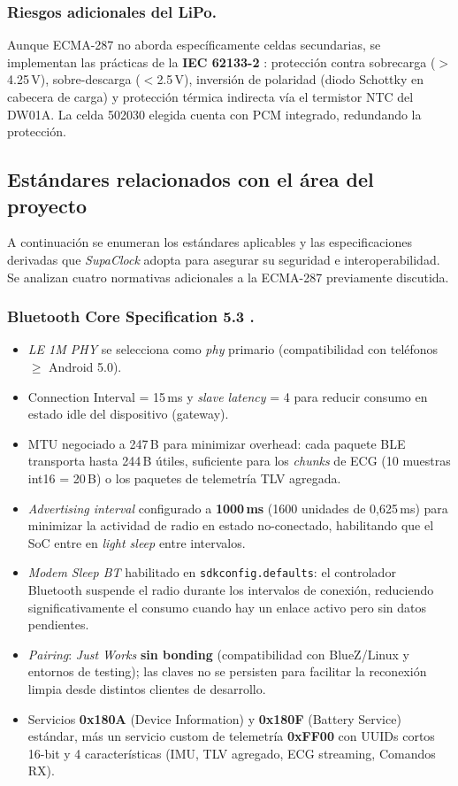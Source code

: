 \documentclass[letterpaper,11pt]{article}
\begin{document}
\subsubsection{Riesgos adicionales del LiPo.} Aunque ECMA-287 no aborda específicamente celdas
secundarias, se implementan las prácticas de la \textbf{IEC 62133-2} \cite{en62133}: protección
contra sobrecarga ($>$4.25\,V), sobre-descarga ($<$2.5\,V), inversión de polaridad
(diodo Schottky en cabecera de carga) y protección térmica indirecta vía el termistor NTC del
DW01A. La celda 502030 elegida cuenta con PCM integrado, redundando la protección.

\subsection{Estándares relacionados con el área del proyecto}
A continuación se enumeran los estándares aplicables y las especificaciones derivadas que
\textit{SupaClock} adopta para asegurar su seguridad e interoperabilidad. Se analizan cuatro
normativas adicionales a la ECMA-287 previamente discutida.

\subsubsection{Bluetooth Core Specification 5.3 \cite{ble_core_spec}.}
\begin{itemize}
    \item \textit{LE 1M PHY} se selecciona como \textit{phy} primario (compatibilidad con
    teléfonos $\geq$ Android 5.0).
    \item Connection Interval = 15\,ms y \textit{slave latency} = 4 para reducir consumo en
    estado idle del dispositivo (gateway).
    \item MTU negociado a 247\,B para minimizar overhead: cada paquete BLE transporta hasta
    244\,B útiles, suficiente para los \textit{chunks} de ECG (10 muestras int16 = 20\,B) o
    los paquetes de telemetría TLV agregada.
    \item \textit{Advertising interval} configurado a \textbf{1000\,ms} (1600 unidades de
    0,625\,ms) para minimizar la actividad de radio en estado no-conectado, habilitando que el
    SoC entre en \textit{light sleep} entre intervalos.
    \item \textit{Modem Sleep BT} habilitado en \texttt{sdkconfig.defaults}: el controlador
    Bluetooth suspende el radio durante los intervalos de conexión, reduciendo significativamente
    el consumo cuando hay un enlace activo pero sin datos pendientes.
    \item \textit{Pairing}: \textit{Just Works} \textbf{sin bonding} (compatibilidad con
    BlueZ/Linux y entornos de testing); las claves no se persisten para facilitar la reconexión
    limpia desde distintos clientes de desarrollo.
    \item Servicios \textbf{0x180A} (Device Information) y \textbf{0x180F} (Battery Service)
    estándar, más un servicio custom de telemetría \textbf{0xFF00} con UUIDs cortos 16-bit
    y 4 características (IMU, TLV agregado, ECG streaming, Comandos RX).
\end{itemize}
\end{document}
